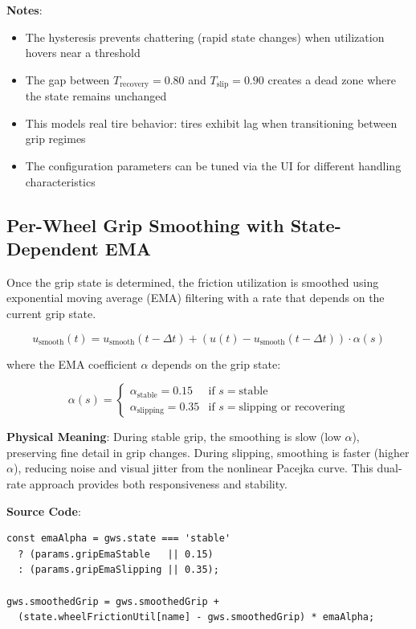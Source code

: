 \textbf{Notes}:
\begin{itemize}
  \item The hysteresis prevents chattering (rapid state changes) when utilization hovers near a threshold
  \item The gap between $T_{\text{recovery}} = 0.80$ and $T_{\text{slip}} = 0.90$ creates a dead zone where the state remains unchanged
  \item This models real tire behavior: tires exhibit lag when transitioning between grip regimes
  \item The configuration parameters can be tuned via the UI for different handling characteristics
\end{itemize}

\subsection{Per-Wheel Grip Smoothing with State-Dependent EMA}

Once the grip state is determined, the friction utilization is smoothed using exponential moving average (EMA) filtering with a rate that depends on the current grip state.

\begin{equation}
  u_{\text{smooth}}(t) = u_{\text{smooth}}(t-\Delta t) + (u(t) - u_{\text{smooth}}(t-\Delta t)) \cdot \alpha(s)
  \label{eq:grip-ema}
\end{equation}

where the EMA coefficient $\alpha$ depends on the grip state:

\begin{equation}
  \alpha(s) = \begin{cases}
    \alpha_{\text{stable}} = 0.15 & \text{if } s = \text{stable} \\
    \alpha_{\text{slipping}} = 0.35 & \text{if } s = \text{slipping or recovering}
  \end{cases}
  \label{eq:grip-ema-alpha}
\end{equation}

\textbf{Physical Meaning}: During stable grip, the smoothing is slow (low $\alpha$), preserving fine detail in grip changes. During slipping, smoothing is faster (higher $\alpha$), reducing noise and visual jitter from the nonlinear Pacejka curve. This dual-rate approach provides both responsiveness and stability.

\textbf{Source Code}: 

\begin{lstlisting}[caption={State-dependent grip smoothing}]
const emaAlpha = gws.state === 'stable'
  ? (params.gripEmaStable   || 0.15)
  : (params.gripEmaSlipping || 0.35);

gws.smoothedGrip = gws.smoothedGrip +
  (state.wheelFrictionUtil[name] - gws.smoothedGrip) * emaAlpha;
\end{lstlisting}

